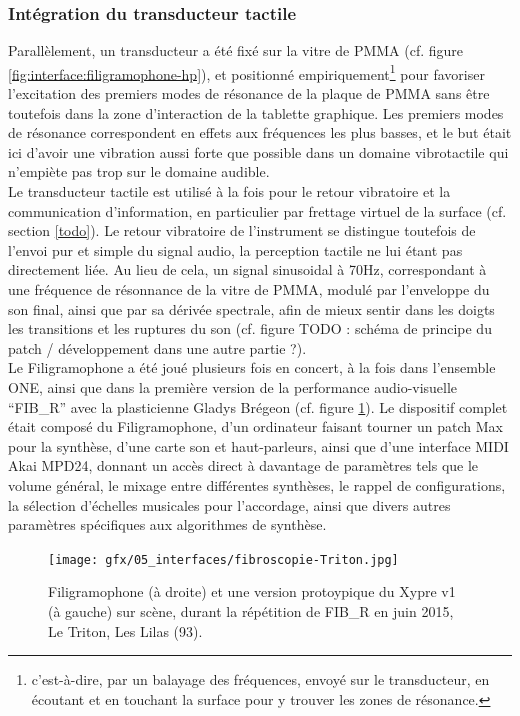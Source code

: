 \subsubsection{Intégration du transducteur tactile}

\noindent Parallèlement, un transducteur a été fixé sur la vitre de \gls{PMMA} (cf. figure \ref{fig:interface:filigramophone-hp}), et positionné empiriquement\footnote{c'est-à-dire, par un balayage des fréquences, envoyé sur le transducteur, en écoutant et en touchant la surface pour y trouver les zones de résonance.} pour favoriser l'excitation des premiers modes de résonance de la plaque de \gls{PMMA} sans être toutefois dans la zone d'interaction de la tablette graphique. Les premiers modes de résonance correspondent en effets aux fréquences les plus basses, et le but était ici d'avoir une vibration aussi forte que possible dans un domaine vibrotactile qui n'empiète pas trop sur le domaine audible.\\
\indent Le transducteur tactile est utilisé à la fois pour le retour vibratoire et la communication d'information, en particulier par frettage virtuel de la surface (cf. section \ref{todo}). Le retour vibratoire de l'instrument se distingue toutefois de l'envoi pur et simple du signal audio, la perception tactile ne lui étant pas directement liée. Au lieu de cela, un signal sinusoidal à 70Hz, correspondant à une fréquence de résonnance de la vitre de \gls{PMMA}, modulé par l'enveloppe du son final, ainsi que par sa dérivée spectrale, afin de mieux sentir dans les doigts les transitions et les ruptures du son (cf. figure TODO : schéma de principe du patch / développement dans une autre partie ?).\\
\indent Le Filigramophone a été joué plusieurs fois en concert, à la fois dans l'ensemble ONE, ainsi que dans la première version de la performance audio-visuelle ``FIB\_R'' avec la plasticienne Gladys Brégeon (cf. figure \ref{fig:interface:filigramophone-Xypre-Triton}). Le dispositif complet était composé du Filigramophone, d'un ordinateur faisant tourner un patch Max pour la synthèse, d'une carte son et haut-parleurs, ainsi que d'une interface \gls{MIDI} Akai MPD24, donnant un accès direct à davantage de paramètres tels que le volume général, le mixage entre différentes synthèses, le rappel de configurations, la sélection d'échelles musicales pour l'accordage, ainsi que divers autres paramètres spécifiques aux algorithmes de synthèse.

\begin{figure}[!htbp]
	\captionsetup{format=plain}%
	\texttt{[image: gfx/05\_interfaces/fibroscopie-Triton.jpg]}
	\caption{Filigramophone (à droite) et une version protoypique du Xypre v1 (à gauche) sur scène, durant la répétition de FIB\_R en juin 2015, Le Triton, Les Lilas (93).}
	\label{fig:interface:filigramophone-Xypre-Triton}
\end{figure}


